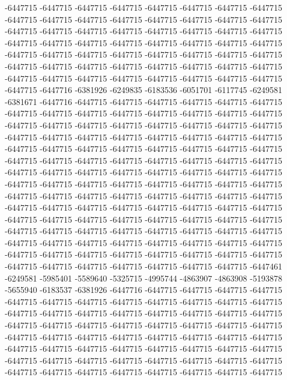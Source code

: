 -6447715 -6447715 -6447715 -6447715 -6447715 -6447715 -6447715 -6447715 -6447715 -6447715 -6447715 -6447715 -6447715 -6447715 -6447715 -6447715 -6447715 -6447715 -6447715 -6447715 -6447715 -6447715 -6447715 -6447715 -6447715 -6447715 -6447715 -6447715 -6447715 -6447715 -6447715 -6447715 -6447715 -6447715 -6447715 -6447715 -6447715 -6447715 -6447715 -6447715 -6447715 -6447715 -6447715 -6447715 -6447715 -6447715 -6447715 -6447715 -6447715 -6447715 -6447715 -6447715 -6447715 -6447715 -6447715 -6447715 -6447715 -6447716 -6381926 -6249835 -6183536 -6051701 -6117745 -6249581 -6381671 -6447716 -6447715 -6447715 -6447715 -6447715 -6447715 -6447715 -6447715 -6447715 -6447715 -6447715 -6447715 -6447715 -6447715 -6447715 -6447715 -6447715 -6447715 -6447715 -6447715 -6447715 -6447715 -6447715 -6447715 -6447715 -6447715 -6447715 -6447715 -6447715 -6447715 -6447715 -6447715 -6447715 -6447715 -6447715 -6447715 -6447715 -6447715 -6447715 -6447715 -6447715 -6447715 -6447715 -6447715 -6447715 -6447715 -6447715 -6447715 -6447715 -6447715 -6447715 -6447715 -6447715 -6447715 -6447715 -6447715 -6447715 -6447715 -6447715 -6447715 -6447715 -6447715 -6447715
-6447715 -6447715 -6447715 -6447715 -6447715 -6447715 -6447715 -6447715 -6447715 -6447715 -6447715 -6447715 -6447715 -6447715 -6447715 -6447715 -6447715 -6447715 -6447715 -6447715 -6447715 -6447715 -6447715 -6447715 -6447715 -6447715 -6447715 -6447715 -6447715 -6447715 -6447715 -6447715 -6447715 -6447715 -6447715 -6447715 -6447715 -6447715 -6447715 -6447715 -6447715 -6447715 -6447715 -6447715 -6447715 -6447715 -6447715 -6447715 -6447715 -6447715 -6447715 -6447715 -6447715 -6447715 -6447715 -6447461 -6249581 -5985401 -5589640 -5325715 -4995744 -4863907 -4863908 -5193878 -5655940 -6183537 -6381926 -6447716 -6447715 -6447715 -6447715 -6447715 -6447715 -6447715 -6447715 -6447715 -6447715 -6447715 -6447715 -6447715 -6447715 -6447715 -6447715 -6447715 -6447715 -6447715 -6447715 -6447715 -6447715 -6447715 -6447715 -6447715 -6447715 -6447715 -6447715 -6447715 -6447715 -6447715 -6447715 -6447715 -6447715 -6447715 -6447715 -6447715 -6447715 -6447715 -6447715 -6447715 -6447715 -6447715 -6447715 -6447715 -6447715 -6447715 -6447715 -6447715 -6447715 -6447715 -6447715 -6447715 -6447715 -6447715 -6447715 -6447715 -6447715 -6447715 -6447715 -6447715
